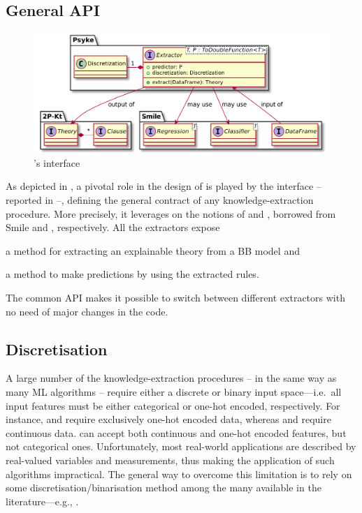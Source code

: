 \documentclass[12pt,a4paper,openright,twoside]{book}
\begin{document}
\subsection{General API}\label{ssec:general-api}

\begin{figure}
    \centering
    \includegraphics[width=.7\linewidth]{figures/extractor-api.pdf}
    \caption{\psyke{}'s  interface}
    \label{fig:extractor-api}
\end{figure}

As depicted in , a pivotal role in the design of \psyke{} is played by the  interface -- reported in  --, defining the general contract of any knowledge-extraction procedure.
%
More precisely, it leverages on the notions of  and , borrowed from Smile and \twopkt{} \cite{kotlindsi4prolog-woa2020,2pkt-jelia2021}, respectively.
%
All the \psyke{} extractors expose
%
\begin{inlinelist}
    \item a method for extracting an explainable theory from a BB model and
    \item a method to make predictions by using the extracted rules.
\end{inlinelist}
%
The common API makes it possible to switch between different \psyke{} extractors with no need of major changes in the code.

\subsection{Discretisation}

A large number of the knowledge-extraction procedures -- in the same way as many ML algorithms -- require either a discrete or binary input space---i.e.\ all input features must be either categorical or one-hot encoded, respectively.
%
For instance, \real{} and \trepan{} require exclusively one-hot encoded data, whereas \iter{} and \gridex{} require continuous data.
%
\cart{} can accept both continuous and one-hot encoded features, but not categorical ones.
%
Unfortunately, most real-world applications are described by real-valued variables and measurements, thus making the application of such algorithms impractical.
%
The general way to overcome this limitation is to rely on some discretisation/binarisation method among the many available in the literature---e.g., \cite{DoughertyKS95,YangWW10,Kerber92,HoS97,Boulle04,KurganC04,Cano2016}.
\end{document}
